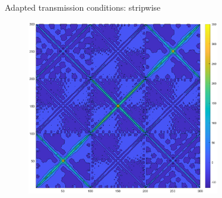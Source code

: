 \documentclass{beamer}
\begin{document}
\begin{frame}{Adapted transmission conditions: stripwise}
\begin{figure}
	\centering
	\includegraphics[width=0.75\textwidth]{AOSM/PLOT_AOSMConv_RedBlack_T.eps}
\end{figure}
\end{frame}
\end{document}
